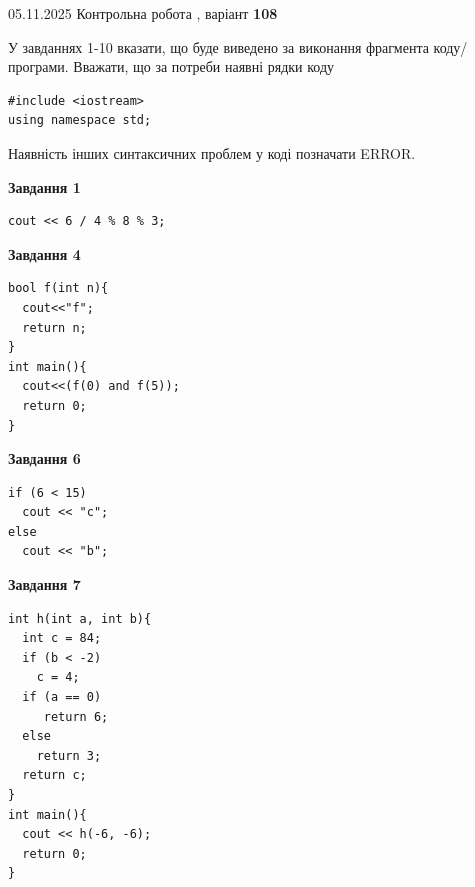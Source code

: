 \documentclass[12pt, ukrainian]{article}
\begin{document}
\newpage

{\Large{05.11.2025 Контрольна робота , варіант  \No \textbf { 108 }\par}}
{
\begin {large}
У завданнях 1-10 вказати, що буде виведено за виконання фрагмента коду/про\-гра\-ми.
Вважати, що за потреби наявні рядки коду
\begin{verbatim}
#include <iostream>
using namespace std;
\end{verbatim}
Наявність інших синтаксичних проблем у коді позначати ERROR.

\begin{minipage}[t]{7.0cm}

\begin{center}
\textbf{Завдання 1}
\end{center}
\vspace{-8mm}

\begin{verbatim}
cout << 6 / 4 % 8 % 3;
\end{verbatim}



\begin{center}
\textbf{Завдання 4}
\end{center}
\vspace{-8mm}

\begin{verbatim}
bool f(int n){
  cout<<"f";
  return n;
}
int main(){
  cout<<(f(0) and f(5));
  return 0;
}
\end{verbatim}



\begin{center}
\textbf{Завдання 6}
\end{center}
\vspace{-8mm}

\begin{verbatim}
if (6 < 15)
  cout << "c";
else
  cout << "b";
\end{verbatim}



\begin{center}
\textbf{Завдання 7}
\end{center}
\vspace{-8mm}

\begin{verbatim}
int h(int a, int b){
  int c = 84;
  if (b < -2)
    c = 4;
  if (a == 0)
     return 6;
  else
    return 3;
  return c;
}
int main(){
  cout << h(-6, -6);
  return 0;
}
\end{verbatim}


\end{minipage}
\end{large}}
\end{document}
